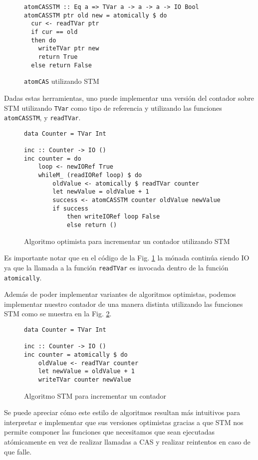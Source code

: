 \begin{figure}[t]
\begin{verbatim}
atomCASSTM :: Eq a => TVar a -> a -> a -> IO Bool
atomCASSTM ptr old new = atomically $ do
  cur <- readTVar ptr
  if cur == old
  then do
    writeTVar ptr new
    return True
  else return False
\end{verbatim}
\caption{\texttt{atomCAS} utilizando STM}
\end{figure}

Dadas estas herramientas, uno puede implementar una versión del contador sobre STM utilizando \texttt{TVar} como tipo de referencia y utilizando las funciones \texttt{atomCASSTM}, y \texttt{readTVar}.

\begin{figure}[t]
\begin{verbatim}
data Counter = TVar Int

inc :: Counter -> IO ()
inc counter = do
    loop <- newIORef True
    whileM_ (readIORef loop) $ do
        oldValue <- atomically $ readTVar counter
        let newValue = oldValue + 1
        success <- atomCASSTM counter oldValue newValue
        if success
            then writeIORef loop False
            else return ()
\end{verbatim}
\caption{Algoritmo optimista para incrementar un contador utilizando STM}
\label{fig:lockfree-counter-example-stm}
\end{figure}

Es importante notar que en el código de la Fig. \ref{fig:lockfree-counter-example-stm} la mónada continúa siendo IO ya que la llamada a la función \texttt{readTVar} es invocada dentro de la función \texttt{atomically}.

Además de poder implementar variantes de algoritmos optimistas, podemos implementar nuestro contador de una manera distinta utilizando las funciones STM como se muestra en la Fig. \ref{fig:counter-example-stm}.

\begin{figure}[t]
\begin{verbatim}
data Counter = TVar Int

inc :: Counter -> IO ()
inc counter = atomically $ do
    oldValue <- readTVar counter
    let newValue = oldValue + 1
    writeTVar counter newValue
\end{verbatim}
\caption{Algoritmo STM para incrementar un contador}
\label{fig:counter-example-stm}
\end{figure}

Se puede apreciar cómo este estilo de algoritmos resultan más intuitivos para interpretar e implementar que sus versiones optimistas gracias a que STM nos permite componer las funciones que necesitamos que sean ejecutadas atómicamente en vez de realizar llamadas a CAS y realizar reintentos en caso de que falle.
